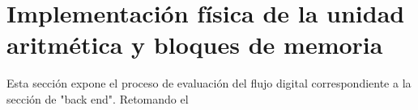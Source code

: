 \chapter{Implementación física de la unidad aritmética y bloques de memoria}

Esta sección expone el proceso de evaluación del flujo digital correspondiente a la sección de "back end". Retomando el 